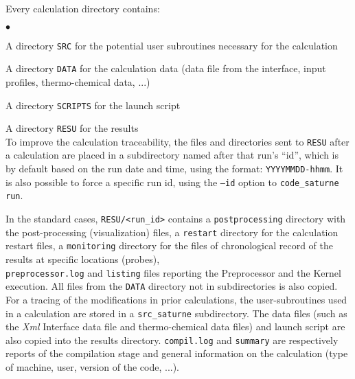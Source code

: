 \noindent
Every calculation directory contains:
\begin{list}{$\bullet$}{}
\item A directory \texttt{SRC} for the potential user subroutines
      necessary for the calculation
\item A directory \texttt{DATA} for the calculation data (data
      file from the interface, input profiles, thermo-chemical data, ...)
\item A directory \texttt{SCRIPTS} for the launch script
\item A directory \texttt{RESU} for the results\\
To improve the calculation traceability, the files and directories
sent to \texttt{RESU} after a calculation are  placed in a subdirectory
named after that run's ``id'', which is by default based on the run date
and time, using the format: \texttt{YYYYMMDD-hhmm}.
It is also possible to force a specific run id, using the \texttt{--id}
option to \texttt{code\_saturne run}.
\end{list}

\noindent
In the standard cases, \texttt{RESU/<run\_id>} contains a
\texttt{postprocessing} directory with the post-processing
(visualization) files, a \texttt{restart} directory for the calculation
restart files, a \texttt{monitoring} directory for the files of chronological
record of the results at specific locations (probes),\\
\texttt{preprocessor.log} and \texttt{listing} files reporting the
Preprocessor and the Kernel execution. All files from the \texttt{DATA}
directory not in subdirectories is also copied. For a tracing of
the modifications in prior calculations, the user-subroutines used in
a calculation are stored in a \texttt{src\_saturne} subdirectory. The data files
(such as the {\em Xml} Interface data file and thermo-chemical data files) and
launch script are also copied into the results directory. \texttt{compil.log} and
\texttt{summary} are respectively reports of the compilation stage and
general information on the calculation (type of machine, user,
version of the code, ...).

